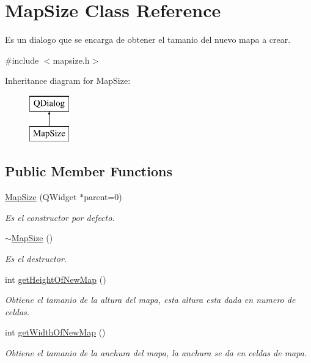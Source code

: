\hypertarget{class_map_size}{\section{Map\-Size Class Reference}
\label{class_map_size}
}


Es un dialogo que se encarga de obtener el tamanio del nuevo mapa a crear.  




{\ttfamily \#include $<$mapsize.\-h$>$}

Inheritance diagram for Map\-Size\-:\begin{figure}[H]
\begin{center}
\leavevmode
\includegraphics[height=2.000000cm]{class_map_size}
\end{center}
\end{figure}
\subsection*{Public Member Functions}
\begin{DoxyCompactItemize}
\item 
\hyperlink{class_map_size_aaad41b69e09aad8500a60115663abba7}{Map\-Size} (Q\-Widget $\ast$parent=0)
\begin{DoxyCompactList}\small\item\em Es el constructor por defecto. \end{DoxyCompactList}\item 
\hypertarget{class_map_size_a3f200dce80be15b15093469b6b6df3fa}{\hyperlink{class_map_size_a3f200dce80be15b15093469b6b6df3fa}{$\sim$\-Map\-Size} ()}\label{class_map_size_a3f200dce80be15b15093469b6b6df3fa}

\begin{DoxyCompactList}\small\item\em Es el destructor. \end{DoxyCompactList}\item 
int \hyperlink{class_map_size_afb2d611ef961cd31a98c5a8fcbd87341}{get\-Height\-Of\-New\-Map} ()
\begin{DoxyCompactList}\small\item\em Obtiene el tamanio de la altura del mapa, esta altura esta dada en numero de celdas. \end{DoxyCompactList}\item 
int \hyperlink{class_map_size_a9fad6a10e445b1fd4c593cd5c7f98d48}{get\-Width\-Of\-New\-Map} ()
\begin{DoxyCompactList}\small\item\em Obtiene el tamanio de la anchura del mapa, la anchura se da en celdas de mapa. \end{DoxyCompactList}\end{DoxyCompactItemize}


